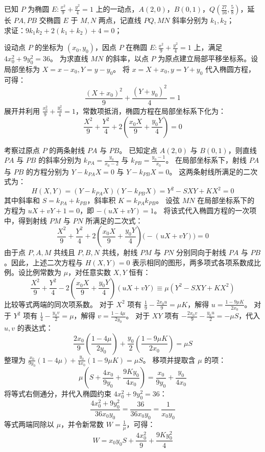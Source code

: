 \begin{exercise}
已知 \(P\) 为椭圆 \(E: \frac{x^2}{9} + \frac{y^2}{4} = 1\) 上的一动点，\(A(2,0)\)，\(B(0,1)\)，\(Q\left(\frac{27}{16}, \frac{5}{8}\right)\)，延长 \(PA,PB\) 交椭圆 \(E\) 于 \(M,N\) 两点，记直线 \(PQ,MN\) 斜率分别为 \(k_1,k_2\)；\\
求证：\(9k_1k_2 + 2(k_1 + k_2) + 4 = 0\)；
\end{exercise}
\begin{solution}
设动点 $P$ 的坐标为 $(x_0, y_0)$，因点 $P$ 在椭圆 $E: \frac{x^2}{9} + \frac{y^2}{4} = 1$ 上，满足 $4x_0^2 + 9y_0^2 = 36$。
为求直线 $MN$ 的斜率，以点 $P$ 为原点建立局部平移坐标系。设局部坐标为 $X = x - x_0, Y = y - y_0$。
将 $x = X + x_0, y = Y + y_0$ 代入椭圆方程，可得：
$$ \frac{(X + x_0)^2}{9} + \frac{(Y + y_0)^2}{4} = 1 $$
展开并利用 $\frac{x_0^2}{9} + \frac{y_0^2}{4} = 1$，常数项抵消，椭圆方程在局部坐标系下化为：
$$ \frac{X^2}{9} + \frac{Y^2}{4} + 2\left(\frac{x_0 X}{9} + \frac{y_0 Y}{4}\right) = 0 $$

考察过原点 $P$ 的两条射线 $PA$ 与 $PB$。
已知定点 $A(2,0)$ 与 $B(0,1)$，则直线 $PA$ 与 $PB$ 的斜率分别为 $k_{PA} = \frac{y_0}{x_0 - 2}$ 与 $k_{PB} = \frac{y_0 - 1}{x_0}$。
在局部坐标系下，射线 $PA$ 与 $PB$ 的方程分别为 $Y - k_{PA} X = 0$ 与 $Y - k_{PB} X = 0$。
这两条射线所满足的二次式为：
$$ H(X, Y) = (Y - k_{PA} X)(Y - k_{PB} X) = Y^2 - S X Y + K X^2 = 0 $$
其中斜率和 $S = k_{PA} + k_{PB}$，斜率积 $K = k_{PA} k_{PB}$。
设弦 $MN$ 在局部坐标系下的方程为 $uX + vY + 1 = 0$，即 $-(uX + vY) = 1$。
将该式代入椭圆方程的一次项中，得到射线 $PM$ 与 $PN$ 所满足的二次式：
$$ \frac{X^2}{9} + \frac{Y^2}{4} + 2\left(\frac{x_0 X}{9} + \frac{y_0 Y}{4}\right)\big(-(uX + vY)\big) = 0 $$
由于点 $P, A, M$ 共线且 $P, B, N$ 共线，射线 $PM$ 与 $PN$ 分别同向于射线 $PA$ 与 $PB$。因此，上述二次方程与 $H(X, Y) = 0$ 表示相同的图形，两多项式各项系数成比例。设比例常数为 $\mu$，对任意实数 $X, Y$ 恒有：
$$ \frac{X^2}{9} + \frac{Y^2}{4} - 2\left(\frac{x_0 X}{9} + \frac{y_0 Y}{4}\right)(uX + vY) \equiv \mu(Y^2 - S X Y + K X^2) $$
比较等式两端的同次项系数。
对于 $X^2$ 项有 $\frac{1}{9} - \frac{2x_0 u}{9} = \mu K$，解得 $u = \frac{1 - 9\mu K}{2x_0}$。
对于 $Y^2$ 项有 $\frac{1}{4} - \frac{y_0 v}{2} = \mu$，解得 $v = \frac{1 - 4\mu}{2y_0}$。
对于 $XY$ 项有 $-\frac{2x_0 v}{9} - \frac{y_0 u}{2} = -\mu S$，代入 $u, v$ 的表达式：
$$ \frac{2x_0}{9} \left(\frac{1 - 4\mu}{2y_0}\right) + \frac{y_0}{2} \left(\frac{1 - 9\mu K}{2x_0}\right) = \mu S $$
整理为 $\frac{x_0}{9y_0}(1 - 4\mu) + \frac{y_0}{4x_0}(1 - 9\mu K) = \mu S$。
移项并提取含 $\mu$ 的项：
$$ \mu\left(S + \frac{4x_0}{9y_0} + \frac{9K y_0}{4x_0}\right) = \frac{x_0}{9y_0} + \frac{y_0}{4x_0} $$
将等式右侧通分，并代入椭圆约束 $4x_0^2 + 9y_0^2 = 36$：
$$ \frac{4x_0^2 + 9y_0^2}{36x_0 y_0} = \frac{36}{36x_0 y_0} = \frac{1}{x_0 y_0} $$
等式两端同除以 $\mu$，并令新常数 $W = \frac{1}{\mu}$，可得：
$$ W = x_0 y_0 S + \frac{4x_0^2}{9} + \frac{9K y_0^2}{4} $$


\end{solution}

